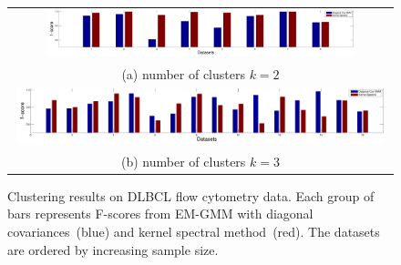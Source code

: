 \begin{figure}
  \centering
	\begin{tabular}{c}
		\includegraphics[width=0.82\textwidth]{../experiment/figure/paired_bar_chat_k_2} \\
		(a) number of clusters $k=2$ \\
		\includegraphics[width=0.98\textwidth]{../experiment/figure/paired_bar_chat_k_3}  \\
		(b) number of clusters $k=3$
	\end{tabular}
  \vspace{-3mm}
  \caption{Clustering results on DLBCL flow cytometry data. Each group of bars represents F-scores from EM-GMM with diagonal covariances~(blue) and kernel spectral method~(red). The datasets are ordered by increasing sample size.}\label{fig:real_data}
  \vspace{-3mm}
\end{figure}
